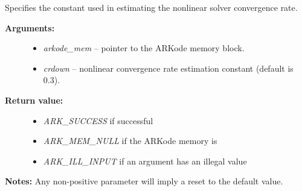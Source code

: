 \documentclass[letterpaper,10pt,english]{sphinxmanual}
\begin{document}
\begin{fulllineitems}
\label{c_interface/User_callable:ARKodeSetNonlinCRDown}
Specifies the constant used in estimating the nonlinear solver convergence rate.
\begin{description}
\item[{\textbf{Arguments:}}] \leavevmode\begin{itemize}
\item {} 
\emph{arkode\_mem} -- pointer to the ARKode memory block.

\item {} 
\emph{crdown} -- nonlinear convergence rate estimation constant (default is 0.3).

\end{itemize}

\item[{\textbf{Return value:}}] \leavevmode\begin{itemize}
\item {} 
\emph{ARK\_SUCCESS} if successful

\item {} 
\emph{ARK\_MEM\_NULL} if the ARKode memory is 

\item {} 
\emph{ARK\_ILL\_INPUT} if an argument has an illegal value

\end{itemize}

\end{description}

\textbf{Notes:} Any non-positive parameter will imply a reset to the default value.

\end{fulllineitems}

\end{document}
